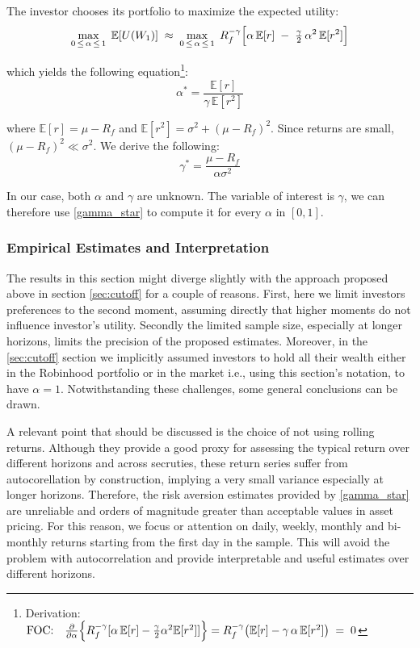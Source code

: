 The investor chooses its portfolio to maximize the expected utility:
\begin{equation}
    \max_{0 \,\le\, \alpha \,\le\, 1}\; \mathbb{E}[U(W_1)]
    \;\approx\;
    \max_{0 \,\le\, \alpha \,\le\, 1}\;
    R_f^{-\gamma}\Bigl[\alpha\,\mathbb{E}[r]\;-\;\tfrac{\gamma}{2}\,\alpha^2\,\mathbb{E}[r^2]\Bigr]
\end{equation}

which yields the following equation\footnote{
    Derivation:
    $\text{FOC:}\quad
    \frac{\partial}{\partial \alpha}\Bigl\{R_f^{-\gamma}[\alpha\,\mathbb{E}[r]-\tfrac{\gamma}{2}\alpha^2\mathbb{E}[r^2]]\Bigr\}
    =
    R_f^{-\gamma}\bigl(\mathbb{E}[r]-\gamma\,\alpha\,\mathbb{E}[r^2]\bigr)
    \;=\;0$}:
\begin{equation}
    \alpha^*=
    \frac{\mathbb{E}[r]}{\gamma\,\mathbb{E}[r^2]}
\end{equation}

where $\mathbb{E}[r]=\mu-R_f$ and $\mathbb{E}[r^2]=\sigma^2+(\mu-R_f)^2$. 
Since returns are small, $(\mu-R_f)^2\ll\sigma^2$. We derive the following:
\begin{equation}
    \gamma^* = \frac{\mu-R_f}{\alpha \sigma^2}
    \label{gamma_star}
\end{equation}

In our case, both $\alpha$ and $\gamma$ are unknown. 
The variable of interest is $\gamma$, we can therefore use \ref{gamma_star} to compute it for every $\alpha$ in $[0,1]$. 


\subsubsection{Empirical Estimates and Interpretation}
\label{sec:gamma_estimates}
The results in this section might diverge slightly with the approach proposed above in section \ref{sec:cutoff} for a couple of reasons. 
First, here we limit investors preferences to the second moment, assuming directly that higher moments do not influence investor's utility.
Secondly the limited sample size, especially at longer horizons, limits the precision of the proposed estimates.
Moreover, in the \ref{sec:cutoff} section we implicitly assumed investors to hold all their wealth either in the Robinhood portfolio or in the market i.e.,
using this section's notation, to have $\alpha=1$.
Notwithstanding these challenges, some general conclusions can be drawn. 

A relevant point that should be discussed is the choice of not using rolling returns. 
Although they provide a good proxy for assessing the typical return over different horizons and across secruties, 
these return series suffer from autocorellation by construction, implying a very small variance especially at longer horizons.
Therefore, the risk aversion estimates provided by \ref{gamma_star} are unreliable and orders of magnitude greater than acceptable values in asset pricing.
For this reason, we focus or attention on daily, weekly, monthly and bi-monthly returns starting from the first day in the sample. This will avoid the problem with autocorrelation and provide interpretable and useful estimates over different horizons.

